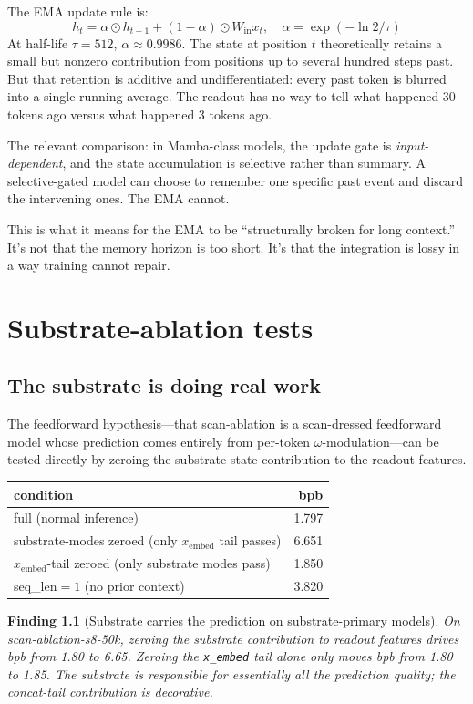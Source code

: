 \documentclass[11pt,openany]{book}
\newtheorem{finding}{Finding}[chapter]
\begin{document}
The EMA update rule is:
\[
    h_t = \alpha \odot h_{t-1} + (1 - \alpha) \odot W_{\mathrm{in}} x_t, \quad
    \alpha = \exp(-\ln 2 / \tau)
\]
At half-life $\tau=512$, $\alpha \approx 0.9986$. The state at position $t$
theoretically retains a small but nonzero contribution from positions up to
several hundred steps past. But that retention is additive and undifferentiated:
every past token is blurred into a single running average. The readout has no
way to tell what happened 30 tokens ago versus what happened 3 tokens ago.

The relevant comparison: in Mamba-class models, the update gate is
\emph{input-dependent}, and the state accumulation is selective rather
than summary. A selective-gated model can choose to remember one specific
past event and discard the intervening ones. The EMA cannot.

This is what it means for the EMA to be ``structurally broken for long
context.'' It's not that the memory horizon is too short. It's that the
integration is lossy in a way training cannot repair.

\chapter{Substrate-ablation tests}
\label{ch:substrate-ablation}

\section{The substrate is doing real work}

The feedforward hypothesis---that scan-ablation is a scan-dressed
feedforward model whose prediction comes entirely from per-token
$\omega$-modulation---can be tested directly by zeroing the substrate state
contribution to the readout features.

\begin{longtable}{lr}
\toprule
condition & bpb \\
\midrule
full (normal inference) & 1.797 \\
substrate-modes zeroed (only $x_{\mathrm{embed}}$ tail passes) & 6.651 \\
$x_{\mathrm{embed}}$-tail zeroed (only substrate modes pass) & 1.850 \\
seq\_len$=1$ (no prior context) & 3.820 \\
\bottomrule
\end{longtable}

\begin{finding}[Substrate carries the prediction on substrate-primary models]
On scan-ablation-s8-50k, zeroing the substrate contribution to readout
features drives bpb from 1.80 to 6.65. Zeroing the \texttt{x\_embed} tail
alone only moves bpb from 1.80 to 1.85. The substrate is responsible for
essentially all the prediction quality; the concat-tail contribution is
decorative.
\end{finding}
\end{document}
